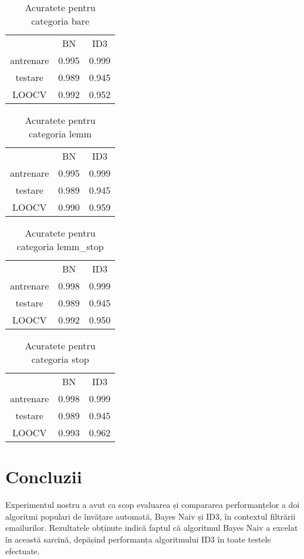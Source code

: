 \documentclass{article}
\begin{document}
\begin{table}[!h]
    \centering
    \begin{tabular}{ccc}
         &  BN& ID3\\
         antrenare&   0.995& 0.999 \\
         testare&  0.989& 0.945\\
         LOOCV&  0.992& 0.952\\
    \end{tabular}
    \caption{Acuratete pentru categoria bare}
\end{table}
\begin{table}[!h]
    \centering
    \begin{tabular}{ccc}
         &  BN& ID3\\
         antrenare&   0.995&  0.999 \\
         testare&  0.989& 0.945\\
         LOOCV&   0.990& 0.959\\
    \end{tabular}
    \caption{Acuratete pentru categoria lemm}
\end{table}
\begin{table}[!h]
    \centering
    \begin{tabular}{ccc}
         &  BN& ID3\\
         antrenare&   0.998&  0.999 \\
         testare&  0.989& 0.945\\ 
         LOOCV&  0.992& 0.950\\
    \end{tabular}
    \caption{Acuratete pentru categoria lemm\_stop}
\end{table}
\begin{table}[!h]
    \centering
    \begin{tabular}{ccc}
         &  BN& ID3\\
         antrenare&   0.998&  0.999 \\
         testare&  0.989& 0.945\\
         LOOCV&  0.993& 0.962\\
    \end{tabular}
    \caption{Acuratete pentru categoria stop}
\end{table}


\newpage
\section{Concluzii}
Experimentul nostru a avut ca scop evaluarea și compararea performanțelor a doi algoritmi populari de învățare automată, Bayes Naiv și ID3, în contextul filtrării emailurilor. Rezultatele obținute indică faptul că algoritmul Bayes Naiv a excelat în această sarcină, depășind performanța algoritmului ID3 în toate testele efectuate.
\end{document}
